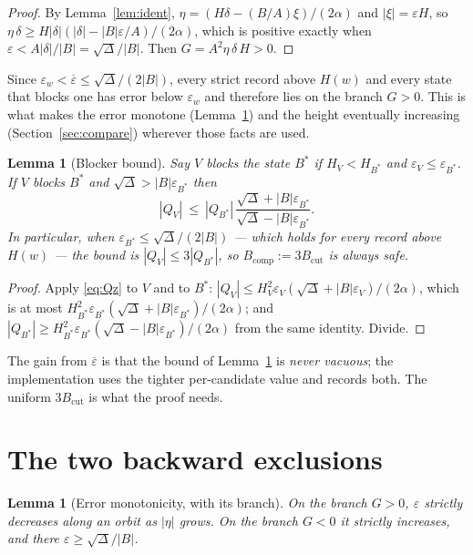 \documentclass[11pt]{article}
\newtheorem{lemma}[theorem]{Lemma}
\theoremstyle{definition}
\theoremstyle{remark}
\newcommand{\dd}{\delta}
\newcommand{\epsbar}{\overline{\varepsilon}}
\newcommand{\epsw}{\varepsilon_w}
\begin{document}
\begin{proof}
By Lemma~\ref{lem:ident}, $\eta=(H\dd-(B/A)\xi)/(2\alpha)$ and $|\xi|=\varepsilon H$, so
$\eta\,\dd\ge H|\dd|(|\dd|-|B|\varepsilon/A)/(2\alpha)$, which is positive exactly when
$\varepsilon<A|\dd|/|B|=\sqrt\Delta/|B|$. Then $G=A^2\eta\,\dd\,H>0$.
\end{proof}

Since $\epsw<\epsbar\le\sqrt\Delta/(2|B|)$, every strict record above $H(w)$ and every state
that blocks one has error below $\epsw$ and therefore lies on the branch $G>0$. This is what
makes the error monotone (Lemma~\ref{lem:epsmono}) and the height eventually increasing
(Section~\ref{sec:compare}) wherever those facts are used.

\begin{lemma}[Blocker bound]\label{lem:blocker}
Say $V$ \emph{blocks} the state $B^{*}$ if $H_V<H_{B^{*}}$ and
$\varepsilon_V\le\varepsilon_{B^{*}}$. If $V$ blocks $B^{*}$ and
$\sqrt\Delta>|B|\varepsilon_{B^{*}}$ then
\[
|Q_V|\ \le\ |Q_{B^{*}}|\,
\frac{\sqrt\Delta+|B|\varepsilon_{B^{*}}}{\sqrt\Delta-|B|\varepsilon_{B^{*}}} .
\]
In particular, when $\varepsilon_{B^{*}}\le\sqrt\Delta/(2|B|)$ --- which holds for every record
above $H(w)$ --- the bound is $|Q_V|\le3|Q_{B^{*}}|$, so
$B_{\mathrm{comp}}:=3B_{\mathrm{cut}}$ is always safe.
\end{lemma}

\begin{proof}
Apply \eqref{eq:Qz} to $V$ and to $B^{*}$: $|Q_V|\le H_V^2\varepsilon_V(\sqrt\Delta+|B|
\varepsilon_V)/(2\alpha)$, which is at most
$H_{B^{*}}^2\varepsilon_{B^{*}}(\sqrt\Delta+|B|\varepsilon_{B^{*}})/(2\alpha)$; and
$|Q_{B^{*}}|\ge H_{B^{*}}^2\varepsilon_{B^{*}}(\sqrt\Delta-|B|\varepsilon_{B^{*}})/(2\alpha)$
from the same identity. Divide.
\end{proof}

The gain from $\epsbar$ is that the bound of Lemma~\ref{lem:blocker} is \emph{never vacuous};
the implementation uses the tighter per-candidate value and records both. The uniform
$3B_{\mathrm{cut}}$ is what the proof needs.

\section{The two backward exclusions}\label{sec:backward}

\begin{lemma}[Error monotonicity, with its branch]\label{lem:epsmono}
On the branch $G>0$, $\varepsilon$ strictly decreases along an orbit as $|\eta|$ grows. On the
branch $G<0$ it strictly \emph{increases}, and there $\varepsilon\ge\sqrt\Delta/|B|$.
\end{lemma}
\end{document}
